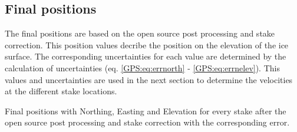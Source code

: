 \subsection{Final positions}

The final positions are based on the open source post processing and stake correction.
This position values decribe the position on the elevation of the ice surface. 
The corresponding uncertainties for each value are determined by the calculation of uncertainties (eq. \ref{GPS:eq:errnorth} - \ref{GPS:eq:errnelev}). 
This values and uncertainties are used in the next section to determine the velocities at the different stake locations. 

\begin{table}[H]
	\caption{Final positions with Northing, Easting and Elevation for every stake after the open source post processing and stake correction with the corresponding error.}
	\centering
	
	\label{GPS:tab:os_tab}
\end{table}
